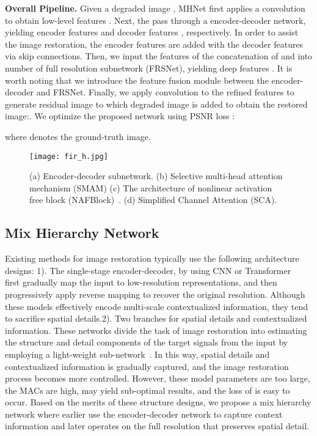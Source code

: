 \documentclass[lettersize,journal]{IEEEtran}
\begin{document}
\noindent\textbf{Overall Pipeline.} Given a degraded image , MHNet first applies a convolution to obtain low-level features . Next, the  pass through a encoder-decoder network, yielding encoder features  and decoder features , respectively. In order to assist the image restoration, the encoder features  are added with the decoder features  via skip connections. Then, we input the features  of the concatenation of  and  into  number of full resolution  subnetwork (FRSNet), yielding deep features . It is worth noting that we introduce the feature fusion module between the encoder-decoder and FRSNet. Finally, we apply  convolution to the refined features to generate residual image  to which degraded image is added to obtain the restored image:. We optimize the proposed network using PSNR loss : 



\noindent where  denotes the ground-truth image.

\begin{figure*}[!htb] \centering
	\texttt{[image: fir\_h.jpg]}
	\caption{(a) Encoder-decoder subnetwork. (b) Selective multi-head attention mechanism (SMAM) (c) The architecture of nonlinear activation free block (NAFBlock)~\cite{chen2022simple}. (d) Simplified Channel Attention (SCA).
 }

	\label{fig:fir_h}
\end{figure*}



\subsection{Mix Hierarchy Network}
Existing methods for image restoration typically use the following architecture designs: 1). The single-stage encoder-decoder, by using CNN or Transformer~\cite{2018Unprocessing,2018learning,deganv2,Zamir2021Restormer,liang2021swinir} first gradually map the input to low-resolution representations, and then progressively apply reverse mapping to recover the original resolution. Although these models effectively encode multi-scale contextualized information, they tend to sacrifice spatial details.2). Two branches for spatial details and  contextualized information. These networks  divide the task of image restoration into estimating the structure and detail components of the target signals from the input by employing a light-weight sub-network~\cite{Zamir2021MPRNet,Zhang_2019_CVPR,RESCAN}. In this way, spatial details and contextualized information is gradually captured, and the image restoration process becomes more controlled. However, these model parameters are too large, the MACs are high, may yield sub-optimal results, and the loss of  is easy to occur. Based on the merits of these  structure designs, we propose a mix hierarchy network where earlier use the encoder-decoder network to capture context information and later operates on the full resolution that preserves spatial detail.
\end{document}
